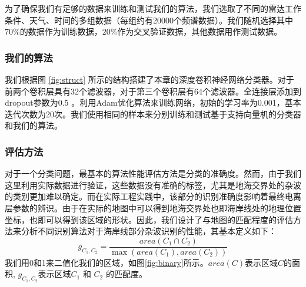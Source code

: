为了确保我们有足够的数据来训练和测试我们的算法，我们选取了不同的雷达工作条件、天气、时间的多组数据（每组约有20000个频谱数据）。我们随机选择其中$70\%$的数据作为训练数据，$20\%$作为交叉验证数据，其他数据用作测试数据。

\subsubsection{我们的算法}
我们根据图 \ref{fig:struct} 所示的结构搭建了本章的深度卷积神经网络分类器。对于前两个卷积层具有32个滤波器，对于第三个卷积层有64个滤波器。全连接层添加到dropout参数为0.5 。利用Adam优化算法来训练网络，初始的学习率为0.001，基本迭代次数为20次。我们使用相同的样本来分别训练和测试基于支持向量机的分类器和我们的算法。

\subsubsection{评估方法}
对于一个分类问题，最基本的算法性能评估方法是分类的准确度。然而，由于我们这里利用实际数据进行验证，这些数据没有准确的标签，尤其是地海交界处的杂波的类别更加难以确定。而在实际工程实践中，该部分的识别准确度影响着最终电离层参数的辨识。由于在实际的地图中可以得到地海交界处也即海岸线处的地理位置坐标，也即可以得到该区域的形状。因此，我们设计了与地图的匹配程度的评估方法来分析不同识别算法对于海岸线部分杂波识别的性能，其基本定义如下：
\begin{equation}
g_{C_1, C_2} = \frac{area({C_1\cap C_2})}{\max(area({C_1}), area({C_2}))}
\end{equation}
我们用0和1来二值化我们的区域，如图\ref{fig:binary}所示。$area(C)$表示区域$C$的面积, $g_{C_1, C_2}$表示区域$C_1$ 和 $C_2$ 的匹配度。
